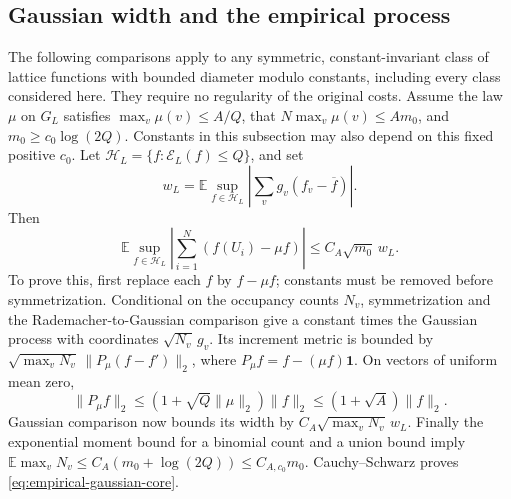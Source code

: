 \documentclass[11pt]{article}
\numberwithin{equation}{section}
\begin{document}
\subsection{Gaussian width and the empirical process}
\label{subsec:empirical-core}

The following comparisons apply to any symmetric, constant-invariant class of lattice functions with bounded diameter modulo constants, including every class considered here. They require no regularity of the original costs.
Assume the law $\mu$ on $G_L$ satisfies
$\max_v\mu(v)\le A/Q$, that $N\max_v\mu(v)\le A m_0$, and
$m_0\ge c_0\log(2Q)$. Constants in this subsection may also depend
on this fixed positive $c_0$. Let $\mathcal H_L=\{f:\mathcal E_L(f)\le Q\}$,
and set
\[
 w_L=\mathbb E\sup_{f\in\mathcal H_L}
            \left|\sum_vg_v(f_v-\overline f)\right|.
\]
Then
\begin{equation}\label{eq:empirical-gaussian-core}
 \mathbb E\sup_{f\in\mathcal H_L}
 \left|\sum_{i=1}^N(f(U_i)-\mu f)\right|
 \le C_A\sqrt{m_0}\,w_L.
\end{equation}
To prove this, first replace each $f$ by $f-\mu f$; constants must be
removed before symmetrization. Conditional on the occupancy counts
$N_v$, symmetrization and the Rademacher-to-Gaussian comparison give a
constant times the Gaussian process with coordinates
$\sqrt{N_v}\,g_v$. Its increment metric is bounded by
$\sqrt{\max_vN_v}\,\|P_\mu(f-f')\|_2$, where
$P_\mu f=f-(\mu f)\mathbf1$. On vectors of uniform mean zero,
\[
 \|P_\mu f\|_2\le(1+\sqrt Q\|\mu\|_2)\|f\|_2
                          \le(1+\sqrt A)\|f\|_2.
\]
Gaussian comparison now bounds its width by
$C_A\sqrt{\max_vN_v}\,w_L$. Finally the exponential moment bound for
a binomial count and a union bound imply
$\mathbb E\max_vN_v\le C_A(m_0+\log(2Q))\le C_{A,c_0}m_0$.
Cauchy--Schwarz proves \eqref{eq:empirical-gaussian-core}.
\end{document}
